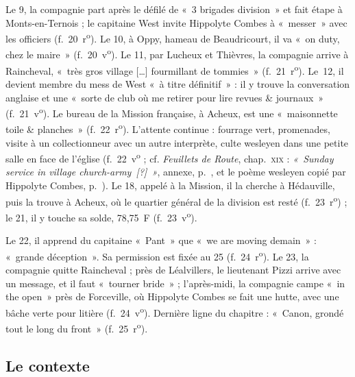 Le 9, la compagnie part après le défilé de «~3 brigades division~» et fait étape à Monts-en-Ternois ; le capitaine West invite Hippolyte Combes à «~messer~» avec les officiers (f.~20~r\textsuperscript{o}). Le 10, à Oppy, hameau de Beaudricourt, il va «~on duty, chez le maire~» (f.~20~v\textsuperscript{o}). Le 11, par Lucheux et Thièvres, la compagnie arrive à Raincheval, «~très gros village […] fourmillant de tommies~» (f.~21~r\textsuperscript{o}). Le~12, il devient membre du mess de West «~à titre définitif~» : il y trouve la conversation anglaise et une «~sorte de club où me retirer pour lire revues \& journaux~» (f.~21~v\textsuperscript{o}). Le bureau de la Mission française, à Acheux, est une «~maisonnette toile \& planches~» (f.~22~r\textsuperscript{o}). L'attente continue : fourrage vert, promenades, visite à un collectionneur avec un autre interprète, culte wesleyen dans une petite salle en face de l'église (f.~22~v\textsuperscript{o} ; cf. \textit{Feuillets de Route}, chap.~\textsc{xix} : \textit{«~Sunday service in village church-army~\textup{[?]}~»}, annexe, p.~\pageref{annexe:doc6-xix}, et le poème wesleyen copié par Hippolyte Combes, p.~\pageref{annexe:doc4}). Le 18, appelé à la Mission, il la cherche à Hédauville, puis la trouve à Acheux, où le quartier général de la division est resté (f.~23~r\textsuperscript{o}) ; le 21, il y touche sa solde, 78,75~F (f.~23~v\textsuperscript{o}).

Le 22, il apprend du capitaine «~Pant~» que «~we are moving demain~» : «~grande déception~». Sa permission est fixée au 25 (f.~24~r\textsuperscript{o}). Le 23, la compagnie quitte Raincheval ; près de Léalvillers, le lieutenant Pizzi arrive avec un message, et il faut «~tourner bride~» ; l'après-midi, la compagnie campe «~in the open~» près de Forceville, où Hippolyte Combes se fait une hutte, avec une bâche verte pour litière (f.~24~v\textsuperscript{o}). Dernière ligne du chapitre : «~Canon, grondé tout le long du front~» (f.~25~r\textsuperscript{o}).

\subsection*{Le contexte}


